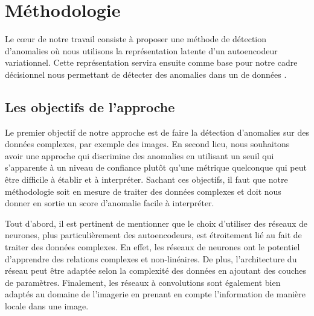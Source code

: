 \chapter{Méthodologie}     %
\label{chap:methodologie}                   %

Le cœur de notre travail consiste à proposer une méthode de détection d'anomalies où nous utilisons la représentation latente d'un autoencodeur variationnel. Cette représentation servira ensuite comme base pour notre cadre décisionnel nous permettant de détecter des anomalies dans un \DIFdelbegin {}\DIFdelend \DIFaddbegin {}\DIFaddend de données \DIFaddbegin {}\DIFaddend .

\section{Les objectifs de l'approche} \label{objectifs_metho}

Le premier objectif de notre approche est de faire la détection d'anomalies sur des données complexes, \DIFdelbegin {}\DIFdelend par exemple des images. En second lieu, nous souhaitons avoir une approche qui discrimine des anomalies en utilisant un seuil qui s'apparente à un niveau de confiance plutôt qu'\DIFaddbegin {}\DIFaddend une métrique quelconque qui peut être difficile à établir et à interpréter. Sachant ces \DIFdelbegin {}\DIFdelend objectifs, il faut que notre méthodologie soit en mesure de traiter des données complexes et doit nous donner en sortie un score d'anomalie facile à interpréter.

Tout d'abord, il est pertinent de mentionner que le choix  d'utiliser des réseaux de neurones, plus particulièrement des autoencodeurs, est étroitement lié au fait de traiter des données complexes. En effet, les réseaux de neurones ont le potentiel d'apprendre des relations complexes et non-linéaires. De plus, l'architecture du réseau peut être adaptée selon la complexité des données en ajoutant des couches de paramètres. Finalement, les réseaux à convolutions sont également bien adaptés au domaine de l'imagerie en prenant en compte l'information de manière locale dans une image.

